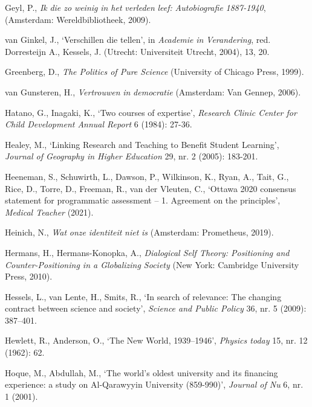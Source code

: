 \documentclass[smallauthor, chapterhaspagenum, nochapterinheader, pagenuminheader,  bigchapnum,medium2, tocpages, garamond, titleinheader]{jote-book}
\begin{document}
\begin{references}
		Geyl, P., \emph{Ik}\emph{ die zo }\emph{weinig}\emph{ in het }\emph{verleden}\emph{ }\emph{leef}\emph{: }\emph{Autobiografie}\emph{ 1887-1940}, (Amsterdam: Wereldbibliotheek, 2009).



		van Ginkel, J., ‘Verschillen die tellen', in \emph{Academie}\emph{ in }\emph{Verandering}, red. Dorresteijn A., Kessels, J. (Utrecht: Universiteit Utrecht, 2004), 13, 20.



		Greenberg, D., \emph{The Politics of Pure Science} (University of Chicago Press, 1999).



		van Gunsteren, H., \emph{Vertrouwen}\emph{ in }\emph{democratie} (Amsterdam: Van Gennep, 2006).



		Hatano, G., Inagaki, K., ‘Two courses of expertise', \emph{Research Clinic Center for Child Development Annual Report} 6 (1984): 27-36.



		Healey, M., ‘Linking Research and Teaching to Benefit Student Learning', \emph{Journal of Geography in Higher Education} 29, nr. 2 (2005): 183-201.



		Heeneman, S., Schuwirth, L., Dawson, P., Wilkinson, K., Ryan, A., Tait, G., Rice, D., Torre, D., Freeman, R., van der Vleuten, C., ‘Ottawa 2020 consensus statement for programmatic assessment -- 1. Agreement on the principles', \emph{Medical Teacher} (2021).



		Heinich, N., \emph{Wat }\emph{onze}\emph{ }\emph{identiteit}\emph{ }\emph{niet}\emph{ is} (Amsterdam: Prometheus, 2019).



		Hermans, H., Hermans-Konopka, A., \emph{Dialogical Self Theory: Positioning and Counter-Positioning in a Globalizing Society} (New York: Cambridge University Press, 2010).



		Hessels, L., van Lente, H., Smits, R., ‘In search of relevance: The changing contract between science and society', \emph{Science and Public Policy} 36, nr. 5 (2009): 387--401.



		Hewlett, R., Anderson, O., ‘The New World, 1939--1946', \emph{Physics today} 15, nr. 12 (1962): 62.



		Hoque, M., Abdullah, M., ‘The world's oldest university and its financing experience: a study on Al-Qarawyyin University (859-990)', \emph{Journal of Nu} 6, nr. 1 (2001).




\end{references}
\end{document}
